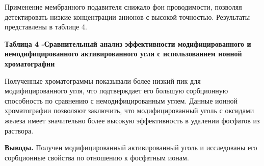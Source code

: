 Применение мембранного подавителя снижало фон проводимости, позволяя
детектировать низкие концентрации анионов с высокой точностью.
Результаты представлены в таблице 4.

{\bfseries Таблица 4 -Сравнительный анализ эффективности модифицированного
и немодифицированного активированного угля с использованием ионной
хроматографии}


Полученные хроматограммы показывали более низкий пик для
модифицированного угля, что подтверждает его большую сорбционную
способность по сравнению с немодифицированным углем. Данные ионной
хроматографии позволяют заключить, что модифицированный уголь с оксидами
железа имеет значительно более высокую эффективность в удалении фосфатов
из раствора.

{\bfseries Выводы.} Получен модифицированный активированный уголь и
исследованы его сорбционные свойства по отношению к фосфатным ионам.

